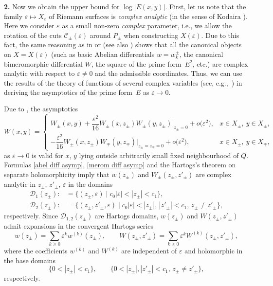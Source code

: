 \documentclass[pdftex]{sigma}
\numberwithin{equation}{section}
\theoremstyle{definition}
\begin{document}
{\bf 2.} Now we obtain the upper bound for $\log |E(x,y)|$.
First, let us note that the family $\varepsilon\mapsto X_\varepsilon$ of Riemann surfaces is {\it complex analytic} (in the sense of Kodaira \cite[Definition 2.8]{Kod}). Here we consider $\varepsilon$ as a small non-zero {\it complex} parameter, i.e., we allow the rotation of the cuts $\mathscr{C}_\pm(\varepsilon)$ around $P_\pm$ when constructing $X(\varepsilon)$. Due to this fact, the same reasoning as in \cite[Section~2.3]{KokKorMPAG} or \cite[Section~2]{KokKorJDG} (see also \cite[Chapter~3]{Fay}) shows that all the canonical objects on $X=X(\varepsilon)$ (such as basic Abelian differentials $w=w_{k}^\pm$, the canonical bimeromorphic differential $W$, the square of the prime form~$E^2$, etc.) are complex analytic with respect to $\varepsilon\ne 0$ and the admissible coordinates. Thus, we can use the results of the theory of functions of several complex variables (see, e.g.,~\cite{BM}) in deriving the asymptotics of the prime form~$E$ as $\varepsilon\to 0$.

Due to \cite[Theorem 2]{KokTAMS}, the asymptotics
\begin{equation}
\label{merom diff asymp}
W(x,y)=\begin{cases}
W_\pm(x,y)+\dfrac{\varepsilon^2}{16}W_\pm(x,z_\pm)W_\pm(y,z_\pm)|_{z_\pm=0}+o\bigl(\varepsilon^2\bigr), & x\in X_\pm, \ y\in X_\pm,\\
-\dfrac{\varepsilon^2}{16}W_\pm(x,z_\pm)W_\mp(y,z_\mp)|_{z_\pm=z_\mp=0}+o\bigl(\varepsilon^2\bigr), & x\in X_\pm, \ y\in X_\mp,
\end{cases}
\end{equation}
as $\varepsilon\to 0$ is valid for $x$, $y$ lying outside arbitrarily small fixed neighbourhood of $Q$. Formulas \eqref{abel diff asymp}, \eqref{merom diff asymp} and the Hartogs's theorem on separate holomorphicity imply that $w(z_\pm)$ and $W_\pm(z_\pm,z'_\pm)$ are complex analytic in $z_\pm$, $z'_\pm$, $\varepsilon$ in the domains
\begin{align*}
\mathscr{D}_1(z_\pm):&=\{(z_\pm,\varepsilon) \mid c_0|\varepsilon|<|z_\pm|<c_1\},\\
\mathscr{D}_2(z_\pm):&=\{(z_\pm,z'_\pm,\varepsilon) \mid c_0|\varepsilon|<|z_\pm|,\,|z'_\pm|<c_1, \, z_\pm\ne z'_\pm\},
\end{align*}
respectively. Since $\mathscr{D}_{1,2}(z_\pm)$ are Hartogs domains, $w(z_\pm)$ and $W(z_\pm,z'_\pm)$ admit expansions in the convergent Hartogs series
\begin{equation}
\label{Hartogs series z}
w(z_\pm)=\sum_{k\ge 0}\varepsilon^k w^{(k)}(z_\pm), \qquad W(z_\pm,z'_\pm)=\sum_{k\ge 0}\varepsilon^{k} W^{(k)}(z_\pm,z'_\pm),
\end{equation}
where the coefficients $w^{(k)}$ and $W^{(k)}$ are independent of $\varepsilon$ and holomorphic in the base domains
\[\{0<|z_\pm|<c_1\}, \qquad \{0<|z_\pm|,|z'_\pm|<c_1,\, z_\pm\ne z'_\pm\},\]
respectively.
\end{document}
